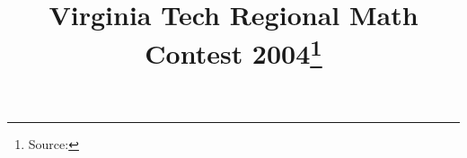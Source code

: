 \documentclass[10pt]{article}
\begin{document}
\title{Virginia Tech Regional Math Contest 2004\footnote{Source: \source}}
\author{\vspace{-2ex}}
\date{\vspace{-6ex}} %
\maketitle







\end{document}
